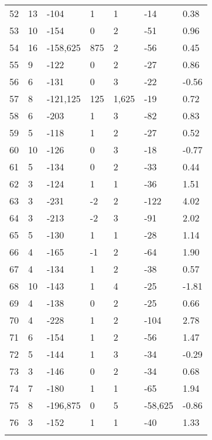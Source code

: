 \begin{appendices}
\begin{longtable}[c]{@{}lllllll@{}}
\rowcolor[HTML]{FFCCC9}
52 & 13 & -104 & 1 & 1 & -14 & 0.38 \\
\rowcolor[HTML]{FFCCC9}
53 & 10 & -154 & 0 & 2 & -51 & 0.96 \\
\rowcolor[HTML]{FFCCC9}
54 & 16 & -158,625 & 875 & 2 & -56 & 0.45 \\
\rowcolor[HTML]{FFCCC9}
55 & 9 & -122 & 0 & 2 & -27 & 0.86 \\
\rowcolor[HTML]{FFCCC9}
56 & 6 & -131 & 0 & 3 & -22 & -0.56 \\
\rowcolor[HTML]{FFCCC9}
57 & 8 & -121,125 & 125 & 1,625 & -19 & 0.72 \\
\rowcolor[HTML]{FFCCC9}
58 & 6 & -203 & 1 & 3 & -82 & 0.83 \\
\rowcolor[HTML]{FFCCC9}
59 & 5 & -118 & 1 & 2 & -27 & 0.52 \\
\rowcolor[HTML]{FFCCC9}
60 & 10 & -126 & 0 & 3 & -18 & -0.77 \\
\rowcolor[HTML]{FFCCC9}
61 & 5 & -134 & 0 & 2 & -33 & 0.44 \\
\rowcolor[HTML]{FFCCC9}
62 & 3 & -124 & 1 & 1 & -36 & 1.51 \\
\rowcolor[HTML]{FFCCC9}
63 & 3 & -231 & -2 & 2 & -122 & 4.02 \\
\rowcolor[HTML]{FFCCC9}
64 & 3 & -213 & -2 & 3 & -91 & 2.02 \\
\rowcolor[HTML]{FFCCC9}
65 & 5 & -130 & 1 & 1 & -28 & 1.14 \\
\rowcolor[HTML]{FFCCC9}
66 & 4 & -165 & -1 & 2 & -64 & 1.90 \\
\rowcolor[HTML]{FFCCC9}
67 & 4 & -134 & 1 & 2 & -38 & 0.57 \\
\rowcolor[HTML]{FFCCC9}
68 & 10 & -143 & 1 & 4 & -25 & -1.81 \\
\rowcolor[HTML]{FFCCC9}
69 & 4 & -138 & 0 & 2 & -25 & 0.66 \\
\rowcolor[HTML]{FFCCC9}
70 & 4 & -228 & 1 & 2 & -104 & 2.78 \\
\rowcolor[HTML]{FFCCC9}
71 & 6 & -154 & 1 & 2 & -56 & 1.47 \\
\rowcolor[HTML]{FFCCC9}
72 & 5 & -144 & 1 & 3 & -34 & -0.29 \\
\rowcolor[HTML]{FFCCC9}
73 & 3 & -146 & 0 & 2 & -34 & 0.68 \\
\rowcolor[HTML]{FFCCC9}
74 & 7 & -180 & 1 & 1 & -65 & 1.94 \\
\rowcolor[HTML]{FFCCC9}
75 & 8 & -196,875 & 0 & 5 & -58,625 & -0.86 \\
\rowcolor[HTML]{FFCCC9}
76 & 3 & -152 & 1 & 1 & -40 & 1.33 \\
\rowcolor[HTML]{FFCCC9}

\end{longtable}
\end{appendices}
